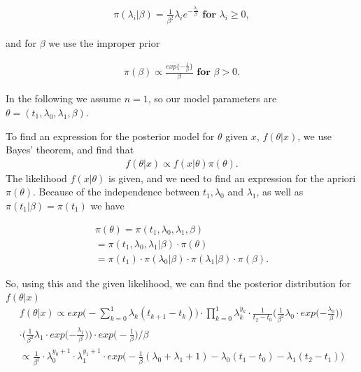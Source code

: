 \begin{align}
    \pi(\lambda_i | \beta) = \frac{1}{\beta^2}\lambda_i e^{-\frac{\lambda_i}{\beta}} \textbf{ for } \lambda_i \geq 0,
\end{align}

and for $\beta$ we use the improper prior 

\begin{align}
    \pi (\beta) \propto \frac{exp\{ -\frac{1}{\beta} \} }{\beta} \textbf{ for } \beta > 0.
\end{align}

In the following we assume $n = 1$, so our model parameters are $\theta = (t_1, \lambda_0, \lambda_1, \beta)$. 

To find an expression for the posterior model for $\theta$ given $x$, $f(\theta|x)$, we use Bayes' theorem, and find that 
\begin{align}
    f(\theta|x) \propto f(x|\theta) \pi(\theta).
\end{align}
The likelihood $f(x | \theta)$ is given, and we need to find an expression for the apriori $\pi(\theta)$. Because of the independence between $t_1, \lambda_0$ and $\lambda_1$, as well as $\pi(t_1|\beta) = \pi(t_1)$ we have

\begin{align}
    \pi(\theta) 
    = \pi(t_1, \lambda_0, \lambda_1, \beta) \nonumber \\
    = \pi(t_1, \lambda_0, \lambda_1 | \beta) \cdot \pi(\theta) \nonumber \\
    = \pi(t_1) \cdot \pi(\lambda_0|\beta) \cdot \pi(\lambda_1|\beta) \cdot \pi(\beta).
\end{align}

So, using this and the given likelihood, we can find the posterior distribution for $f(\theta|x)$
\begin{align} \label{eq:post}
    f(\theta|x) \propto exp \Big( - \sum_{k = 0}^1 \lambda_k (t_{k+1} - t_k) \Big)\cdot \prod_{k = 0}^1 \lambda_k^{y_k} \cdot \frac{1}{t_2-t_0} 
    \Big( \frac{1}{\beta^2} \lambda_0 \cdot
    exp \Big({-\frac{\lambda_0}{\beta}} \Big)  \Big) \nonumber \\ 
    \cdot \Big( \frac{1}{\beta^2} \lambda_1 \cdot exp \Big({-\frac{\lambda_1}{\beta}} \Big) \Big) \cdot exp \Big( -\frac{1}{\beta} \Big)/\beta \nonumber \\
    \propto   \frac{1}{\beta^5} \cdot \lambda_0^{y_0 + 1} \cdot \lambda_1^{y_1 + 1} \cdot exp \Big( -\frac{1}{\beta}(\lambda_0 + \lambda_1 + 1) - \lambda_0(t_1-t_0) - \lambda_1(t_2-t_1) \Big)
\end{align}


